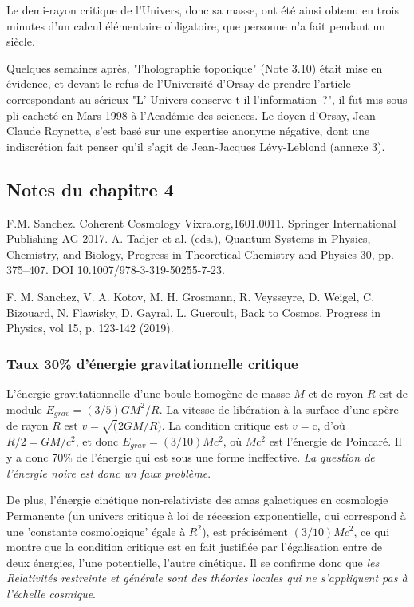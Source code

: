 \documentclass[a4paper,12pt]{article}
\begin{document}
Le demi-rayon critique de l'Univers, donc sa masse, ont été ainsi obtenu en trois minutes d’un calcul élémentaire obligatoire, que personne n’a fait pendant un siècle.

Quelques semaines après, "l'holographie toponique" (Note 3.10) était mise en évidence, et devant le refus de l'Université d'Orsay de prendre l'article correspondant au sérieux "L' Univers conserve-t-il l'information ?", il fut mis sous pli cacheté en Mars 1998 à l'Académie des sciences. Le doyen d'Orsay, Jean-Claude Roynette, s'est basé sur une expertise anonyme négative, dont une indiscrétion fait penser qu'il s'agit de Jean-Jacques Lévy-Leblond (annexe 3). 


\subsection{Notes du chapitre 4}
 
F.M. Sanchez. Coherent Cosmology Vixra.org,1601.0011. Springer International Publishing AG 2017. A. Tadjer et al. (eds.), Quantum Systems in Physics, Chemistry, and Biology, Progress in Theoretical Chemistry and Physics 30, pp. 375--407. DOI 10.1007/978-3-319-50255-7-23. 

F. M. Sanchez, V. A. Kotov,  M. H. Grosmann, R. Veysseyre, D. Weigel, C. Bizouard, N. Flawisky, D. Gayral, L. Gueroult, Back to Cosmos, Progress in Physics, vol 15, p. 123-142 (2019). 



\subsubsection{Taux 30\% d'énergie gravitationnelle critique  }

L'énergie gravitationnelle d'une boule homogène de masse $M$ et de rayon $R$ est de module $E_{grav} = (3/5)GM^2/R$. La vitesse de libération à la surface d’une spère de rayon $R$ est $v =\sqrt(2GM/R)$. La condition critique est $v = $c, d'où  $R/2 = GM/c^2$, et donc $E_{grav} = (3/10) Mc^2$, où $Mc^2$ est l'énergie de Poincaré. Il y a donc 70\% de l'énergie qui est sous une forme ineffective. \textit{La question de l’énergie noire est donc un faux problème}.


De plus, l'énergie cinétique non-relativiste des amas galactiques en cosmologie Permanente (un univers critique à loi de récession exponentielle, qui correspond à une 'constante cosmologique' égale à $R^2$), est précisément $(3/10) Mc^2$, ce qui montre que la condition critique est en fait justifiée par l'égalisation entre de deux énergies, l'une potentielle, l'autre cinétique. Il se confirme donc que \textit{les Relativités restreinte et générale sont des théories locales qui ne s'appliquent pas à l'échelle cosmique}.
\end{document}
